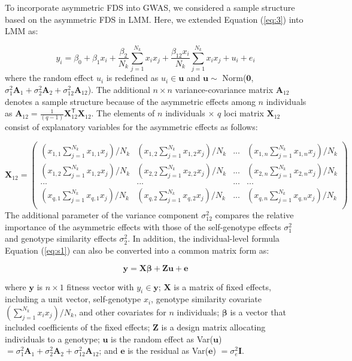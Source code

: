 \documentclass[12pt,]{article}
\begin{document}
To incorporate asymmetric FDS into GWAS, we considered a sample structure based on the asymmetric FDS in LMM. Here, we extended Equation (\ref{eq:3}) into LMM as:

\begin{equation}
y_i = \beta_0 + \beta_1x_i + \frac{\beta_2}{N_k}\sum^{N_{k}}_{j=1}{x_ix_j} + \frac{\beta_{12}x_i}{N_k}\sum^{N_{k}}_{j=1}{x_ix_j} + u_i + e_i \label{eq:s2}
\end{equation}
\noindent
where the random effect $u_i$ is redefined as $u_i \in \mathbf{u}$ and $\mathbf{u} \sim$ Norm($\mathbf{0}$, $\sigma^2_1\mathbf{A}_1+\sigma^2_2\mathbf{A}_2+\sigma^2_{12}\mathbf{A}_{12}$). The additional $n \times n$ variance-covariance matrix $\mathbf{A}_{12}$ denotes a sample structure because of the asymmetric effects among $n$ individuals as $\mathbf{A}_{12}=\frac{1}{(q-1)}\mathbf{X}_{12}^\mathsf{T} \mathbf{X}_{12}$. The elements of $n$ individuals $\times$ $q$ loci matrix $\mathbf{X}_{12}$ consist of explanatory variables for the asymmetric effects as follows:

$$\mathbf{X}_{12}=\left(\begin{array}{cccc}
    (x_{1,1}\sum^{N_k}_{j=1}x_{1,1} x_j)/N_k &  (x_{1,2}\sum^{N_k}_{j=1}x_{1,2} x_j)/N_k &  ... &  (x_{1,n}\sum^{N_k}_{j=1}x_{1,n} x_j)/N_k \\ 
    (x_{1,2}\sum^{N_k}_{j=1}x_{1,2} x_j)/N_k &  (x_{2,2}\sum^{N_k}_{j=1}x_{2,2} x_j)/N_k &  ... &  (x_{2,n}\sum^{N_k}_{j=1}x_{2,n} x_j)/N_k\\
    ... & ... & ... & ... \\
    (x_{q,1}\sum^{N_k}_{j=1}x_{q,1} x_j)/N_k &  (x_{q,2}\sum^{N_k}_{j=1}x_{q,2} x_j)/N_k &  ... &  (x_{q,n}\sum^{N_k}_{j=1}x_{q,n} x_j)/N_k \\
    \end{array} \right)
$$
The additional parameter of the variance component $\sigma^2_{12}$ compares the relative importance of the asymmetric effects with those of the self-genotype effects $\sigma^2_1$ and genotype similarity effects $\sigma^2_2$.
In addition, the individual-level formula Equation (\ref{eq:s1}) can also be converted into a common matrix form \citep{henderson1959estimation} as:

\begin{equation}
    \mathbf{y}=\mathbf{X}\bm{\beta}+\mathbf{Zu}+\mathbf{e} \label{eq:s3}
\end{equation}

where $\mathbf{y}$ is $n \times 1$ fitness vector with $y_i \in \mathbf{y}$; $\mathbf{X}$ is a matrix of fixed effects, including a unit vector, self-genotype $x_i$, genotype similarity covariate $(\sum^{N_k}_{j=1}x_i x_j)/N_k$, and other covariates for $n$ individuals; $\bm{\beta}$ is a vector that included coefficients of the fixed effects; $\mathbf{Z}$ is a design matrix allocating individuals to a genotype; $\mathbf{u}$ is the random effect as Var($\mathbf{u}$) $=\sigma^2_1\mathbf{A}_1+\sigma^2_2\mathbf{A}_2+\sigma^2_{12}\mathbf{A}_{12}$; and $\mathbf{e}$ is the residual as Var($\mathbf{e}$) $=\sigma^2_e\mathbf{I}$. 
\end{document}
